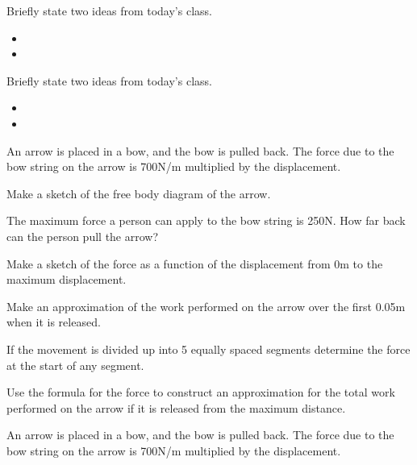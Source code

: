 \postClass

\begin{problem}
\item Briefly state two ideas from today's class.
  \begin{itemize}
  \item
  \item
  \end{itemize}
  \item Briefly state two ideas from today's class.
    \begin{itemize}
    \item
    \item
    \end{itemize}
    \item An arrow is placed in a bow, and the bow is pulled back. The
      force due to the bow string on the arrow is 700N/m multiplied by the
      displacement.
      \begin{subproblem}
      \item Make a sketch of the free body diagram of the arrow.
        \vfill
      \item The maximum force a person can apply to the bow string is
        250N. How far back can the person pull the arrow?
        \vfill
      \item Make a sketch of the force as a function of the displacement
        from 0m to the maximum displacement.
        \vfill
        \clearpage
      \item Make an approximation of the work performed on the arrow over
        the first 0.05m when it is released.
        \vfill
      \item If the movement is divided up into 5 equally spaced segments
        determine the force at the start of any segment.
        \vfill
      \item Use the formula for the force to construct an approximation
        for the total work performed on the arrow if it is released from
        the maximum distance.
        \vfill
      \end{subproblem}
  \clearpage
  \item An arrow is placed in a bow, and the bow is pulled back. The
    force due to the bow string on the arrow is 700N/m multiplied by the
    displacement.
    \begin{subproblem}

\end{subproblem}
\end{problem}
